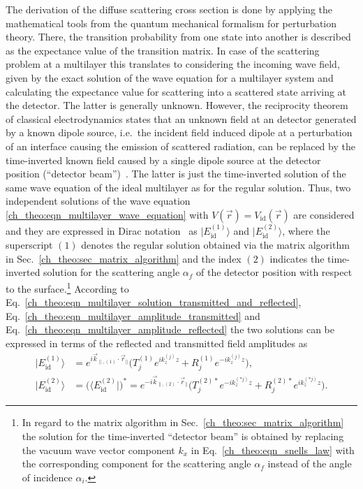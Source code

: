 The derivation of the diffuse scattering cross section is done by applying the mathematical tools from the quantum mechanical formalism for perturbation theory. There, the transition probability from one state into another is described as the expectance value of the transition matrix. In case of the scattering problem at a multilayer this translates to considering the incoming wave field, given by the exact solution of the wave equation for a multilayer system and calculating the expectance value for scattering into a scattered state arriving at the detector. The latter is generally unknown. However, the reciprocity theorem~\cite{lorentz_theorem_1896, l._d._landau_electrodynamics_1960} of classical electrodynamics states that an unknown field at an detector generated by a known dipole source, i.e.~the incident field induced dipole at a perturbation of an interface causing the emission of scattered radiation, can be replaced by the time-inverted known field caused by a single dipole source at the detector position (``detector beam'')~\cite{sinha_x-ray_1988, holy_nonspecular_1994, daillant_diffuse_2009}. The latter is just the time-inverted solution of the same wave equation of the ideal multilayer as for the regular solution. Thus, two independent solutions of the wave equation \eqref{ch_theo:eqn_multilayer_wave_equation} with $V(\vec{r}) = V_\text{id}(\vec{r})$ are considered and they are expressed in Dirac notation~\cite{dirac_new_1939} as $|E_{\text{id}}^{(1)}\rangle$ and $|E_{\text{id}}^{(2)}\rangle$, where the superscript $(1)$ denotes the regular solution obtained via the matrix algorithm in Sec.~\ref{ch_theo:sec_matrix_algorithm} and the index $(2)$ indicates the time-inverted solution for the scattering angle $\alpha_f$ of the detector position with respect to the surface.\footnote{In regard to the matrix algorithm in Sec.~\ref{ch_theo:sec_matrix_algorithm} the solution for the time-inverted ``detector beam'' is obtained by replacing the vacuum wave vector component $k_x$ in Eq.~\eqref{ch_theo:eqn_snells_law} with the corresponding component for the scattering angle $\alpha_f$ instead of the angle of incidence $\alpha_i$.} According to Eq.~\eqref{ch_theo:eqn_multilayer_solution_transmitted_and_reflected}, Eq.~\eqref{ch_theo:eqn_multilayer_amplitude_transmitted} and Eq.~\eqref{ch_theo:eqn_multilayer_amplitude_reflected} the two solutions can be expressed in terms of the reflected and transmitted field amplitudes as
\begin{align}
|E_{\text{id}}^{(1)}\rangle &= e^{i \vec{k}_{\parallel,(1)} \cdot \vec{r}_\parallel} \big(T_{j}^{(1)} e^{i k_z^{(j)} z} + R_{j}^{(1)} e^{-i k_z^{(j)} z}\big) \text{,} \label{ch_theo:eqn_regular_solution_ket}\\
|E_{\text{id}}^{(2)}\rangle &= \big(\langle E_{\text{id}}^{(2)}|\big)^* = e^{-i \vec{k}_{\parallel,(2)} \cdot \vec{r}_\parallel} \big(T_{j}^{(2)*} e^{-i k_z^{(*j)} z} + R_{j}^{(2)*} e^{i k_z^{(*j)} z}\big) \label{ch_theo:eqn_time_inverted_solution_ket} \text{.} 
\end{align}
